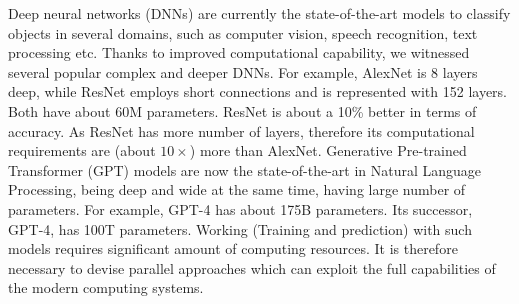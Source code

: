 %
%
%
%


Deep neural networks  (DNNs) are currently the state-of-the-art models to classify objects in several domains, such as computer vision, speech recognition, text processing etc. Thanks to improved computational capability, we witnessed several popular complex and deeper DNNs. For example, AlexNet is 8 layers deep, while ResNet employs short connections and is represented with 152 layers. Both have about 60M parameters. ResNet is about a 10\% better in terms of accuracy. As  ResNet has more number of layers, therefore its computational requirements are (about $10\times$) more than AlexNet. Generative Pre-trained Transformer (GPT) models are now the state-of-the-art in Natural Language Processing, being deep and wide at the same time, having large number of parameters. For  example, GPT-4 has about 175B parameters. Its successor, GPT-4, has 100T parameters. Working (Training and prediction) with such models requires significant amount of computing resources. It is therefore necessary to devise parallel approaches which can exploit the full capabilities of the modern computing systems.    


